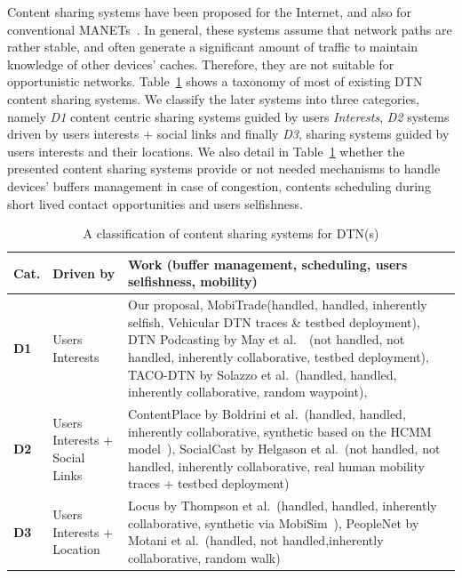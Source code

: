 Content sharing systems have been proposed for the Internet, and also for conventional MANETs~\cite{BitHoc}. In general, these systems assume that network paths are rather stable, and often generate a significant amount of traffic to maintain knowledge of other devices' caches. Therefore, they are not suitable for opportunistic networks. Table~\ref{DisseminationSummary} shows a taxonomy of most of existing DTN content sharing systems. We classify the later systems into three categories, namely \emph{D1} content centric sharing systems guided by users \emph{Interests}, \emph{D2} systems driven by users interests + social links and finally \emph{D3}, sharing systems guided by users interests and their locations. We also detail in Table~\ref{DisseminationSummary} whether the presented content sharing systems provide or not needed mechanisms to handle devices' buffers management in case of congestion, contents scheduling during short lived contact opportunities and users selfishness. 

\begin{table}[!h]
\renewcommand{\arraystretch}{1.1}
\caption{A classification of content sharing systems for DTN(s)}
\centering
\footnotesize
\begin{tabular}{|p{1cm}|p{2cm}|p{9.5cm}|}
\hline
\bfseries Cat. &\bfseries Driven by&\bfseries Work (buffer management, scheduling, users selfishness, mobility)\\
\hline
\bfseries D1&Users Interests & Our proposal, MobiTrade(handled, handled, inherently selfish, Vehicular DTN traces \& testbed deployment), DTN Podcasting by May et al.~\cite{May07wirelessopportunistic}~\cite{Lenders:Podcast}(not handled, not handled, inherently collaborative, testbed deployment), TACO-DTN by Solazzo et al.~\cite{TACODTN}(handled, handled, inherently collaborative, random waypoint), \\
\hline
\bfseries D2&Users Interests + Social Links &ContentPlace by Boldrini et al.~\cite{Chiara:MSWIM08}(handled, handled, inherently collaborative, synthetic based on the HCMM model~\cite{HCMM}), SocialCast by Helgason et al.~\cite{SocialCast2, SocialCast}(not handled, not handled, inherently collaborative, real human mobility traces + testbed deployment)\\
\hline
\bfseries D3&Users Interests + Location & Locus by Thompson et al.~\cite{LOCUS}(handled, handled, inherently collaborative, synthetic via MobiSim~\cite{MobiSim}), PeopleNet by Motani et al.~\cite{Peoplenet}(handled, not handled,inherently collaborative, random walk)\\
\hline
\end{tabular}
\label{DisseminationSummary}
\end{table}

